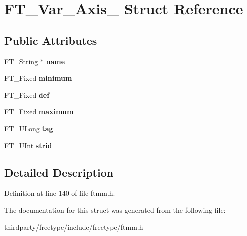 \hypertarget{struct_f_t___var___axis__}{}\section{F\+T\+\_\+\+Var\+\_\+\+Axis\+\_\+ Struct Reference}
\label{struct_f_t___var___axis__}
\subsection*{Public Attributes}
\begin{DoxyCompactItemize}
\item 
\mbox{\label{struct_f_t___var___axis___a8d0e0af322a692999ec3733a3e18a5a4}} 
F\+T\+\_\+\+String $\ast$ {\bfseries name}
\item 
\mbox{\label{struct_f_t___var___axis___aae13a8dea1c96bc3949019e8117e7edb}} 
F\+T\+\_\+\+Fixed {\bfseries minimum}
\item 
\mbox{\label{struct_f_t___var___axis___a37a6ca4188a6bfd95d9d06538bf1a3dd}} 
F\+T\+\_\+\+Fixed {\bfseries def}
\item 
\mbox{\label{struct_f_t___var___axis___a5704641439e9f318cf3c2b73864e3260}} 
F\+T\+\_\+\+Fixed {\bfseries maximum}
\item 
\mbox{\label{struct_f_t___var___axis___a01ef9396e34e740c2d2b8c7117094624}} 
F\+T\+\_\+\+U\+Long {\bfseries tag}
\item 
\mbox{\label{struct_f_t___var___axis___a297d28ab0f5666e56d7575249ccc75d7}} 
F\+T\+\_\+\+U\+Int {\bfseries strid}
\end{DoxyCompactItemize}


\subsection{Detailed Description}


Definition at line 140 of file ftmm.\+h.



The documentation for this struct was generated from the following file\+:\begin{DoxyCompactItemize}
\item 
thirdparty/freetype/include/freetype/ftmm.\+h\end{DoxyCompactItemize}

